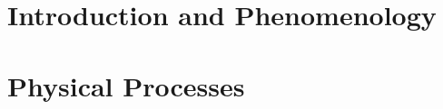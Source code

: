 \documentclass{tufte-book} %
\begin{document}

\part{Introduction and Phenomenology}




\part{Physical Processes}













\end{document}
